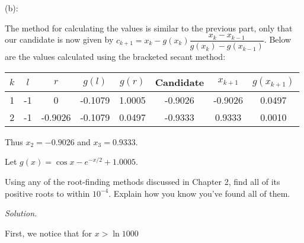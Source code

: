 \documentclass{eh-homework}
\begin{document}
\begin{question}{4}
    (b):

    The method for calculating the values is similar to the previous part, only that our candidate is now given by \(c_{k+1} = x_k - g(x_k) \dfrac{x_k - x_{k-1}}{g(x_k) - g(x_{k-1})}\). Below are the values calculated using the bracketed secant method:
    \begin{center}
        \begin{tabular}{c|c|c|c|c|c|c|c}
            \(k\) & \(l\) & \(r\) & \(g(l)\) & \(g(r)\) & Candidate & \(x_{k+1}\) & \(g(x_{k+1})\) \\
            \hline
            1 & -1 & 0 & -0.1079 & 1.0005 & -0.9026 & -0.9026 & 0.0497 \\
            2 & -1 & -0.9026 & -0.1079 & 0.0497 & -0.9333 & 0.9333 & 0.0010
        \end{tabular}
    \end{center}
    Thus \(x_2 = -0.9026\) and \(x_3 = 0.9333\).
    \end{question}
    
    \begin{question}{5}
    Let \(g(x) = \cos x - e^{-x/2} + 1.0005\).
    
    Using any of the root-finding methods discussed in Chapter 2, find all of its positive roots to within \(10^{-4}\). Explain how you know you’ve found all of them.

    \textit{Solution.}

    First, we notice that for \(x > \ln 1000\) 

    \end{question}
    
\end{document}
